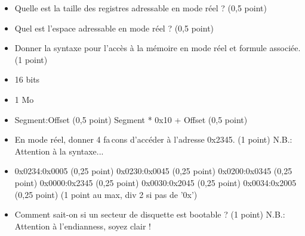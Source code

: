 \begin{itemize}
  \item Quelle est la taille des registres adressable en mode r\'eel ? (0,5 point)
  \item Quel est l'espace adressable en mode r\'eel ? (0,5 point)
  \item Donner la syntaxe pour l'acc\`es \`a la m\'emoire en mode r\'eel et formule associ\'ee. (1 point)
\end{itemize}

\begin{correction}

\begin{itemize}
  \item 16 bits
  \item 1 Mo
  \item Segment:Offset (0,5 point)
  \newline Segment * 0x10 + Offset (0,5 point)
\end{itemize}

\end{correction}

\begin{itemize}
  \item En mode r\'eel, donner 4 fa\,cons d'acc\'eder \`a l'adresse 0x2345. (1 point)
  \newline N.B.: Attention \`a la syntaxe...
\end{itemize}

\begin{correction}

\begin{itemize}
  \item 0x0234:0x0005 (0,25 point)
  \newline 0x0230:0x0045 (0,25 point)
  \newline 0x0200:0x0345 (0,25 point)
  \newline 0x0000:0x2345 (0,25 point)
  \newline 0x0030:0x2045 (0,25 point)
  \newline 0x0034:0x2005 (0,25 point)
  \newline (1 point au max, div 2 si pas de '0x')

\end{itemize}

\end{correction}

\begin{itemize}
  \item Comment sait-on si un secteur de disquette est bootable ? (1 point)
  \newline N.B.: Attention \`a l'endianness, soyez clair !
\end{itemize}


